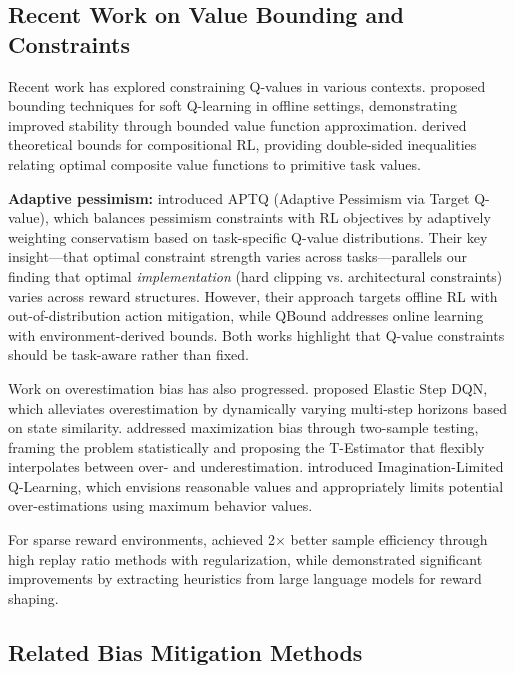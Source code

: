 \documentclass[11pt]{article}
\theoremstyle{definition}
\theoremstyle{remark}
\begin{document}
\subsection{Recent Work on Value Bounding and Constraints}

Recent work has explored constraining Q-values in various contexts. \citet{liu2024boosting} proposed bounding techniques for soft Q-learning in offline settings, demonstrating improved stability through bounded value function approximation. \citet{adamczyk2023bounding} derived theoretical bounds for compositional RL, providing double-sided inequalities relating optimal composite value functions to primitive task values.

\textbf{Adaptive pessimism:} \citet{wang2024adaptive} introduced APTQ (Adaptive Pessimism via Target Q-value), which balances pessimism constraints with RL objectives by adaptively weighting conservatism based on task-specific Q-value distributions. Their key insight—that optimal constraint strength varies across tasks—parallels our finding that optimal \textit{implementation} (hard clipping vs. architectural constraints) varies across reward structures. However, their approach targets offline RL with out-of-distribution action mitigation, while QBound addresses online learning with environment-derived bounds. Both works highlight that Q-value constraints should be task-aware rather than fixed.

Work on overestimation bias has also progressed. \citet{elasticdqn2023} proposed Elastic Step DQN, which alleviates overestimation by dynamically varying multi-step horizons based on state similarity. \citet{twosample2024bias} addressed maximization bias through two-sample testing, framing the problem statistically and proposing the T-Estimator that flexibly interpolates between over- and underestimation. \citet{imagination2025limited} introduced Imagination-Limited Q-Learning, which envisions reasonable values and appropriately limits potential over-estimations using maximum behavior values.

For sparse reward environments, \citet{efficient2024sparse} achieved 2$\times$ better sample efficiency through high replay ratio methods with regularization, while \citet{llmreward2024shaping} demonstrated significant improvements by extracting heuristics from large language models for reward shaping.

\subsection{Related Bias Mitigation Methods}
\end{document}
